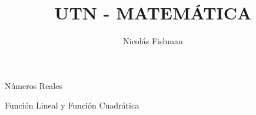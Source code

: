 \documentclass[12pt]{report}
\title{UTN - MATEMÁTICA}
\author{Nicolás Fishman}
\date{}
\begin{document}
\maketitle
\tableofcontents

\begin{itemize}
    {\item Números Reales}
     {\item Función Lineal y Función Cuadrática}
\end{itemize}


\end{document}
